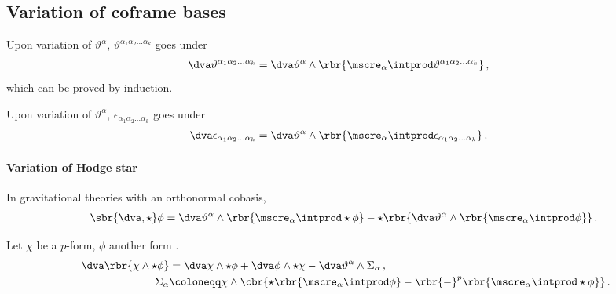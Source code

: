 \documentclass[a4paper]{article}
\begin{document}
\subsection{Variation of coframe bases}


Upon variation of $\vartheta^{\alpha}$, $\vartheta^{\alpha_{1}\alpha_{2}\ldots 
\alpha_{k}}$ goes under
\begin{align}
\dva \vartheta^{\alpha_{1}\alpha_{2}\ldots \alpha_{k}} &=
\dva \vartheta^{\alpha} \wedge \rbr{\mscre_{\alpha}\intprod 
	\vartheta^{\alpha_{1}\alpha_{2}\ldots \alpha_{k}}}\,,
\end{align}
which can be proved by induction.

Upon variation of $\vartheta^{\alpha}$, $\epsilon_{\alpha_{1}\alpha_{2}\ldots 
\alpha_{k}}$ goes under \cite[sec.\ A.2]{Muench1998}
\begin{align}
\dva \epsilon_{\alpha_{1}\alpha_{2}\ldots \alpha_{k}} &=
\dva \vartheta^{\alpha} \wedge \rbr{\mscre_{\alpha}\intprod 
	\epsilon_{\alpha_{1}\alpha_{2}\ldots \alpha_{k}}}\,.
\end{align}

\paragraph{Variation of Hodge star}
In gravitational theories \cite[sec.\ 3.2]{Muench1998} with an orthonormal 
cobasis,
\begin{align}
\sbr{\dva, \star}\phi = 
\dva\vartheta^{\alpha}\wedge\rbr{\mscre_{\alpha}\intprod\star\phi} -
\star\rbr{\dva\vartheta^{\alpha}\wedge\rbr{\mscre_{\alpha}\intprod\phi}}\,.
\end{align}

Let $\chi$ be a $p$-form, $\phi$ another form \cite[sec.\ 5]{Itin1999}.
\begin{align}\
\dva\rbr{\chi\wedge\star\phi} &=
\dva \chi \wedge \star \phi + \dva \phi \wedge \star \chi -
	\dva \vartheta^{\alpha} \wedge \Sigma_{\alpha}\,,
\\
\Sigma_{\alpha} &\coloneqq \chi \wedge \cbr{
	\star\rbr{\mscre_{\alpha}\intprod\phi} -
	\rbr{-}^{p} \rbr{\mscre_{\alpha}\intprod\star\phi}}\,.
\end{align}


\printbibliography
\end{document}
